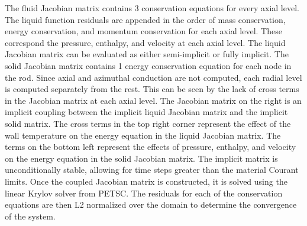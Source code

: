    The fluid Jacobian matrix contains 3 conservation equations for every axial
    level. The liquid function residuals are appended in the order of mass
    conservation, energy conservation, and momentum conservation for each axial
    level. These correspond the pressure, enthalpy, and velocity at each axial
    level. The liquid Jacobian matrix can be evaluated as either semi-implicit
    or fully implicit. The solid Jacobian matrix contains 1 energy conservation
    equation for each node in the rod. Since axial and azimuthal conduction are
    not computed, each radial level is computed separately from the rest. This
    can be seen by the lack of cross terms in the Jacobian matrix at each axial
    level. The Jacobian matrix on the right is an implicit coupling between the
    implicit liquid Jacobian matrix and the implicit solid matrix. The cross
    terms in the top right corner represent the effect of the wall temperature
    on the energy equation in the liquid Jacobian matrix. The terms on the
    bottom left represent the effects of pressure, enthalpy, and velocity on the
    energy equation in the solid Jacobian matrix. The implicit matrix is
    unconditionally stable, allowing for time steps greater than the material
    Courant limits. Once the coupled Jacobian matrix is constructed, it is
    solved using the linear Krylov solver from PETSC. The residuals for each of
    the conservation equations are then L2 normalized over the domain to
    determine the convergence of the system.
    
    






